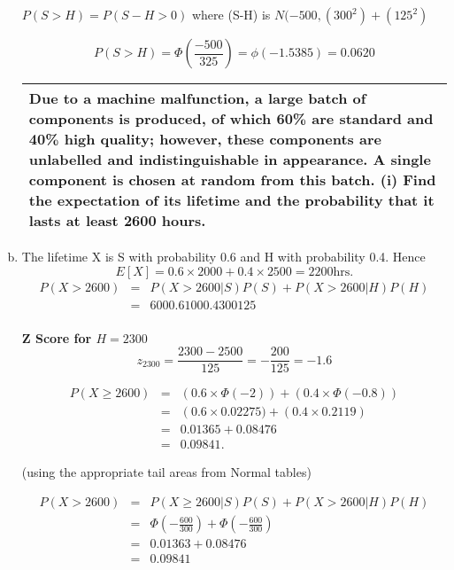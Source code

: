 \documentclass[a4paper,12pt]{article}
\begin{document}
\begin{enumerate}[(a)]
$P(S >H) = P(S-H>0)$ where (S-H)  is $N(-500, (300^2) + (125^2)$

\[P(S >H) = \Phi\left( \frac{-500}{325} \right) = \phi (-1.5385) = 0.0620\]


\begin{table}[ht!]
 \centering
 \begin{tabular}{|p{15cm}|}
 \hline
\noindent  Due to a machine malfunction, a large batch of components is produced, of
which 60\% are standard and 40\% high quality; however, these
components are unlabelled and indistinguishable in appearance. A single
component is chosen at random from this batch.
(i) Find the expectation of its lifetime and the probability that it lasts
at least 2600 hours.
\\ \hline
  \end{tabular}
\end{table}
\item The lifetime X is S with probability 0.6 and H with probability 0.4.
Hence \[E[X ] = 0.6×2000 + 0.4× 2500 = 2200 \mbox{hrs} .\]
\begin{eqnarray*}
P( X > 2600) &=& P(X > 2600 | S)P(S ) + P( X > 2600 | H )P(H )\\
 &=& 600 0.6 100 0.4
300 125\\
\end{eqnarray*}


\begin{framed}
\noindent \textbf{Z Score for $H = 2300$}
\[z_{2300}  = \frac{2300 - 2500}{125}  = -\frac{200}{125} = -1.6\]
\end{framed}

\begin{eqnarray*} 
P(X \geq 2600) &=& \left(0.6 \times \Phi(-2)\right) + \left(0.4 \times \Phi(-0.8)\right)\\
&=& \left(0.6 \times 0.02275) + \left(0.4 \times 0.2119\right)\\
 &=& 0.01365 + 0.08476 \\ 
 &=& 0.09841.
\end{eqnarray*}

(using the appropriate tail areas from Normal tables)





\begin{eqnarray*}
P(X > 2600) &=& P(X \geq 2600|S)P(S) + P(X > 2600|H)P(H) \\
 &=& \Phi \left( - \frac{600}{300}\right) + \Phi \left( - \frac{600}{300}\right) \\
 &=& 0.01363 + 0.08476 \\
 &=& 0.09841 \\
\end{eqnarray*}


\end{enumerate}
\end{document}
